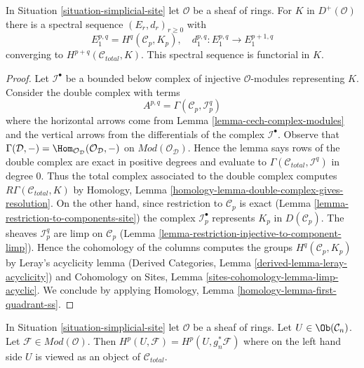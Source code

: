 \begin{lemma}
\label{lemma-simplicial-module-cohomology-site}
In Situation \ref{situation-simplicial-site} let $\mathcal{O}$
be a sheaf of rings. For $K$ in $D^+(\mathcal{O})$
there is a spectral sequence $(E_r, d_r)_{r \geq 0}$ with
$$
E_1^{p, q} = H^q(\mathcal{C}_p, K_p),\quad
d_1^{p, q} : E_1^{p, q} \to E_1^{p + 1, q}
$$
converging to $H^{p + q}(\mathcal{C}_{total}, K)$.
This spectral sequence is functorial in $K$.
\end{lemma}

\begin{proof}
Let $\mathcal{I}^\bullet$ be a bounded below complex of injective
$\mathcal{O}$-modules representing $K$. Consider the double complex with terms
$$
A^{p, q} = \Gamma(\mathcal{C}_p, \mathcal{I}^q_p)
$$
where the horizontal arrows come from
Lemma \ref{lemma-cech-complex-modules}
and the vertical arrows from the differentials of the
complex $\mathcal{I}^\bullet$. Observe that
$\Gamma(\mathcal{D}, -) =
\Hom_{\mathcal{O}_\mathcal{D}}(\mathcal{O}_\mathcal{D}, -)$
on $\textit{Mod}(\mathcal{O}_\mathcal{D})$. Hence the lemma
says rows of the double complex are exact
in positive degrees and evaluate to
$\Gamma(\mathcal{C}_{total}, \mathcal{I}^q)$ in degree $0$.
Thus the total complex associated to the double complex
computes $R\Gamma(\mathcal{C}_{total}, K)$ by
Homology, Lemma \ref{homology-lemma-double-complex-gives-resolution}.
On the other hand, since restriction to $\mathcal{C}_p$ is exact
(Lemma \ref{lemma-restriction-to-components-site})
the complex $\mathcal{I}_p^\bullet$ represents $K_p$ in
$D(\mathcal{C}_p)$. The sheaves $\mathcal{I}_p^q$
are limp on $\mathcal{C}_p$
(Lemma \ref{lemma-restriction-injective-to-component-limp}).
Hence the cohomology of the columns computes the groups
$H^q(\mathcal{C}_p, K_p)$ by Leray's acyclicity lemma
(Derived Categories, Lemma \ref{derived-lemma-leray-acyclicity})
and
Cohomology on Sites, Lemma \ref{sites-cohomology-lemma-limp-acyclic}.
We conclude by applying
Homology, Lemma \ref{homology-lemma-first-quadrant-ss}.
\end{proof}

\begin{lemma}
\label{lemma-sanity-check-modules}
In Situation \ref{situation-simplicial-site} let $\mathcal{O}$
be a sheaf of rings. Let $U \in \Ob(\mathcal{C}_n)$. Let
$\mathcal{F} \in \textit{Mod}(\mathcal{O})$.
Then $H^p(U, \mathcal{F}) = H^p(U, g_n^*\mathcal{F})$
where on the left hand side $U$ is viewed as an object of
$\mathcal{C}_{total}$.
\end{lemma}

